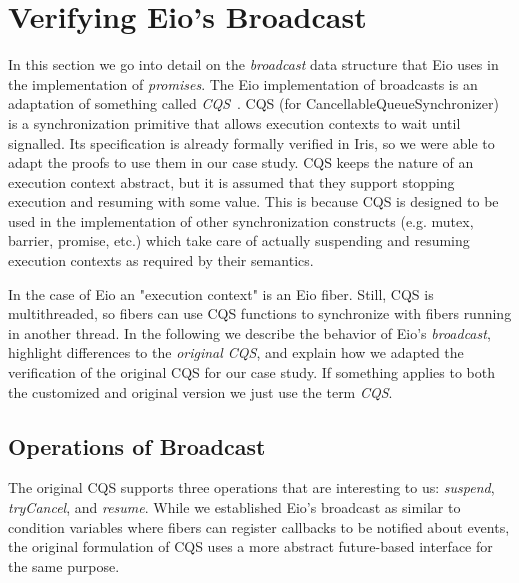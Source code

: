 \section{Verifying Eio's Broadcast}
\label{sec:broadcast}


In this section we go into detail on the \emph{broadcast} data structure that Eio uses in the implementation of \emph{promises}.
The Eio implementation of broadcasts is an adaptation of something called \emph{CQS}~\cite{koval2023cqs}.
CQS (for CancellableQueueSynchronizer) is a synchronization primitive that allows execution contexts to wait until signalled.
Its specification is already formally verified in Iris, so we were able to adapt the proofs to use them in our case study.
CQS keeps the nature of an execution context abstract, but it is assumed that they support stopping execution and resuming with some value.
This is because CQS is designed to be used in the implementation of other synchronization constructs (e.g. mutex, barrier, promise, etc.) which take care of actually suspending and resuming execution contexts as required by their semantics.


In the case of Eio an "execution context" is an Eio fiber.
Still, CQS is multithreaded, so fibers can use CQS functions to synchronize with fibers running in another thread.
In the following we describe the behavior of Eio's \emph{broadcast}, highlight differences to the \emph{original CQS}, and explain how we adapted the verification of the original CQS for our case study.
If something applies to both the customized and original version we just use the term \emph{CQS}.

\subsection{Operations of Broadcast}
\label{sec:broadcast-operations}


The original CQS supports three operations that are interesting to us: \emph{suspend}, \emph{tryCancel}, and \emph{resume}.
While we established Eio's broadcast as similar to condition variables where fibers can register callbacks to be notified about events, the original formulation of CQS uses a more abstract future-based interface for the same purpose.


